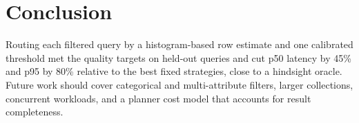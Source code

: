 \section{Conclusion}
\label{sec:conclusion}

Routing each filtered query by a histogram-based row estimate and one calibrated threshold met the quality targets on
held-out queries and cut p50 latency by 45\% and p95 by 80\% relative to the best fixed strategies, close to a
hindsight oracle. Future work should cover categorical and multi-attribute filters, larger collections, concurrent
workloads, and a planner cost model that accounts for result completeness.
